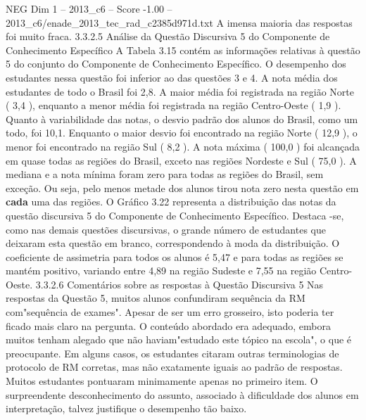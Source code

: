 \begin{textsample}{NEG Dim 1 – 2013\_c6 – Score -1.00 – 2013\_c6/enade\_2013\_tec\_rad\_c2385d971d.txt}
A imensa maioria das respostas foi muito fraca. 3.3.2.5 Análise da Questão Discursiva 5 do Componente de Conhecimento Específico A Tabela 3.15 contém as informações relativas à questão 5 do conjunto do Componente de Conhecimento Específico.
O desempenho dos estudantes nessa questão foi inferior ao das questões 3 e 4.
A nota média dos estudantes de todo o Brasil foi 2,8.
A maior média foi registrada na região Norte ( 3,4 ), enquanto a menor média foi registrada na região Centro-Oeste ( 1,9 ).
Quanto à variabilidade das notas, o desvio padrão dos alunos do Brasil, como um todo, foi 10,1.
Enquanto o maior desvio foi encontrado na região Norte ( 12,9 ), o menor foi encontrado na região Sul ( 8,2 ).
A nota máxima ( 100,0 ) foi alcançada em quase todas as regiões do Brasil, exceto nas regiões Nordeste e Sul ( 75,0 ).
A mediana e a nota mínima foram zero para todas as regiões do Brasil, sem exceção.
Ou seja, pelo menos metade dos alunos tirou nota zero nesta questão em \textbf{cada} uma das regiões.
O Gráfico 3.22 representa a distribuição das notas da questão discursiva 5 do Componente de Conhecimento Específico.
Destaca -se, como nas demais questões discursivas, o grande número de estudantes que deixaram esta questão em branco, correspondendo à moda da distribuição.
O coeficiente de assimetria para todos os alunos é 5,47 e para todas as regiões se mantém positivo, variando entre 4,89 na região Sudeste e 7,55 na região Centro-Oeste. 3.3.2.6 Comentários sobre as respostas à Questão Discursiva 5 Nas respostas da Questão 5, muitos alunos confundiram sequência da RM com"sequência de exames".
Apesar de ser um erro grosseiro, isto poderia ter ficado mais claro na pergunta.
O conteúdo abordado era adequado, embora muitos tenham alegado que não haviam"estudado este tópico na escola", o que é preocupante.
Em alguns casos, os estudantes citaram outras terminologias de protocolo de RM corretas, mas não exatamente iguais ao padrão de respostas.
Muitos estudantes pontuaram minimamente apenas no primeiro item.
O surpreendente desconhecimento do assunto, associado à dificuldade dos alunos em interpretação, talvez justifique o desempenho tão baixo.

\end{textsample}
